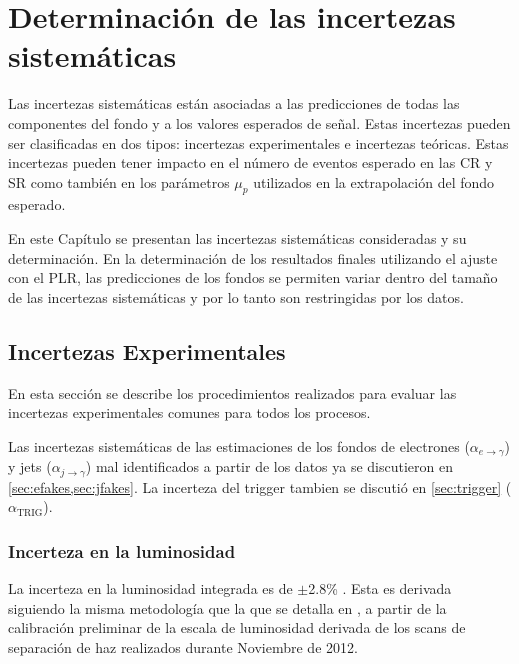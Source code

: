 \chapter{Determinación de las incertezas sistemáticas}
\label{cap:sistematicos}

Las incertezas sistemáticas están asociadas a las predicciones de todas las
componentes del fondo y a los valores esperados de señal. Estas incertezas
pueden ser clasificadas en dos tipos: incertezas experimentales e incertezas
teóricas. Estas incertezas pueden tener impacto en el número de eventos esperado
en las CR y SR como también en los parámetros $\mu_p$ utilizados en la
extrapolación del fondo esperado.

En este Capítulo se presentan las incertezas sistemáticas consideradas y su
determinación. En la determinación de los resultados finales utilizando el
ajuste con el PLR, las predicciones de los fondos se permiten variar dentro del
tamaño de las incertezas sistemáticas y por lo tanto son restringidas por los
datos.



\section{Incertezas Experimentales}\label{sec:expsyst}

En esta sección se describe los procedimientos realizados para evaluar
las incertezas experimentales comunes para todos los procesos.

Las incertezas sistemáticas de las estimaciones de los fondos de electrones
($\alpha_{e\to\gamma}$) y jets ($\alpha_{j\to\gamma}$) mal identificados a partir
de los datos ya se discutieron en \cref{sec:efakes,sec:jfakes}. La incerteza del
trigger tambien se discutió en \cref{sec:trigger} ($\alpha_\text{TRIG}$).

\subsection{Incerteza en la luminosidad}

La incerteza en la luminosidad integrada es de $\pm$2.8\% \cite{lumi2012}.
Esta es derivada siguiendo la misma metodología que la que se detalla en \cite{lumi2011},
a partir de la calibración preliminar  de la escala de luminosidad derivada
de los scans de separación de haz realizados durante Noviembre de 2012.


